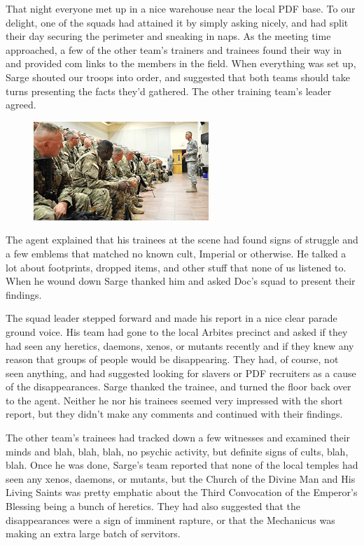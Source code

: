That night everyone met up in a nice warehouse near the local PDF base. 
To our delight, one of the squads had attained it by simply asking nicely, and had split their day securing the perimeter and sneaking in naps. 
As the meeting time approached, a few of the other team’s trainers and trainees found their way in and provided com links to the members in the field. 
When everything was set up, Sarge shouted our troops into order, and suggested that both teams should take turns presenting the facts they’d gathered. 
The other training team’s leader agreed.

\begin{figure}
	\begin{center}
		\includegraphics[width=\figwidth]{pics/8/29.png}
	\end{center}
\end{figure}
The agent explained that his trainees at the scene had found signs of struggle and a few emblems that matched no known cult, Imperial or otherwise. 
He talked a lot about footprints, dropped items, and other stuff that none of us listened to. 
When he wound down Sarge thanked him and asked Doc’s squad to present their findings.

The squad leader stepped forward and made his report in a nice clear parade ground voice. 
His team had gone to the local Arbites precinct and asked if they had seen any heretics, daemons, xenos, or mutants recently and if they knew any reason that groups of people would be disappearing. 
They had, of course, not seen anything, and had suggested looking for slavers or PDF recruiters as a cause of the disappearances. 
Sarge thanked the trainee, and turned the floor back over to the agent. 
Neither he nor his trainees seemed very impressed with the short report, but they didn’t make any comments and continued with their findings.

The other team’s trainees had tracked down a few witnesses and examined their minds and blah, blah, blah, no psychic activity, but definite signs of cults, blah, blah. 
Once he was done, Sarge’s team reported that none of the local temples had seen any xenos, daemons, or mutants, but the Church of the Divine Man and His Living Saints was pretty emphatic about the Third Convocation of the Emperor’s Blessing being a bunch of heretics. 
They had also suggested that the disappearances were a sign of imminent rapture, or that the Mechanicus was making an extra large batch of servitors.

